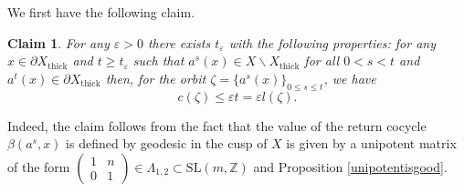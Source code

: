 \documentclass[10pt,reqno]{amsart}
\theoremstyle{Theorem}
\newtheorem{claim}[theorem]{Claim}
\theoremstyle{definition}
\theoremstyle{remark}
\newcommand{\note}[1]{\marginpar{{\color{red}\footnotesize \begin{spacing}{1}#1\end{spacing}}}}
\renewcommand{\epsilon}{\varepsilon}
\newcommand{\sm}{\smallsetminus}
\newcommand{\Z}{\mathbb {Z}}
\newcommand{\e}{\epsilon}
\newcommand{\Xt}{X_{\mathrm{thick}}}
\newcommand{\Sl}{\mathrm{SL}}
\def\red{\color{red}}
\begin{document}


We first have the following claim.
\begin{claim}\label{pathcusp}
 For any $\e>0$ there exists $t_{\e}$ with the following properties: for any $x\in \partial \Xt$ and $t\ge t_\epsilon$ such that  $a^s(x)\in  X\sm \Xt$ for all $0< s < t$ and $a^t(x) \in \partial \Xt$ then, for the orbit $\zeta =  \{a^s (x)\}_{0\leq s \leq t}$, we have
$$c(\zeta) \leq \e t = \epsilon l(\zeta).$$
\end{claim}

Indeed, the claim follows from the fact that the value of the  return cocycle $\beta(a^s, x)$ is defined by geodesic in the cusp of $X$ is given by  a unipotent matrix of the form $\left(\begin{array}{cc}1 & n \\0 & 1\end{array}\right)\in \Lambda_{1,2}\subset \Sl(m,\Z)$ and  Proposition \ref{unipotentisgood}.
\end{document}
